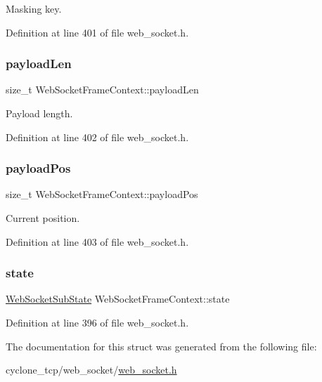 Masking key. 



Definition at line 401 of file web\+\_\+socket.\+h.

\mbox{\label{structWebSocketFrameContext_a55076f17b7463a67c6e07cbd2de8d241}} 
\subsubsection{\texorpdfstring{payload\+Len}{payloadLen}}
{\footnotesize\ttfamily size\+\_\+t Web\+Socket\+Frame\+Context\+::payload\+Len}



Payload length. 



Definition at line 402 of file web\+\_\+socket.\+h.

\mbox{\label{structWebSocketFrameContext_a41d8ddb620bef6087c9806318db79f3f}} 
\subsubsection{\texorpdfstring{payload\+Pos}{payloadPos}}
{\footnotesize\ttfamily size\+\_\+t Web\+Socket\+Frame\+Context\+::payload\+Pos}



Current position. 



Definition at line 403 of file web\+\_\+socket.\+h.

\mbox{\label{structWebSocketFrameContext_ab89eea5d9b9f9a20fd7675db64016dc0}} 
\subsubsection{\texorpdfstring{state}{state}}
{\footnotesize\ttfamily \hyperlink{web__socket_8h_add467139cdc2100a7640faa4fb6c36d7}{Web\+Socket\+Sub\+State} Web\+Socket\+Frame\+Context\+::state}



Definition at line 396 of file web\+\_\+socket.\+h.



The documentation for this struct was generated from the following file\+:\begin{DoxyCompactItemize}
\item 
cyclone\+\_\+tcp/web\+\_\+socket/\hyperlink{web__socket_8h}{web\+\_\+socket.\+h}\end{DoxyCompactItemize}
